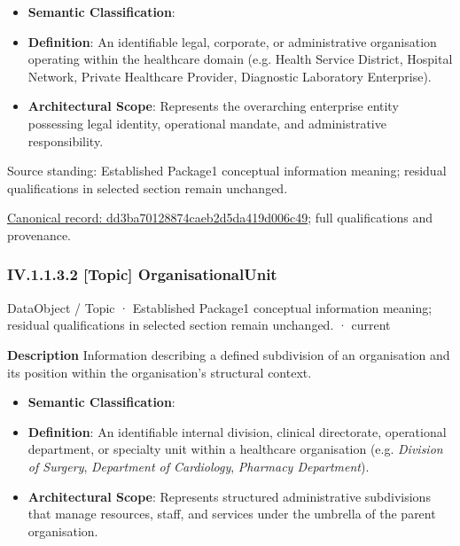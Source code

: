 \begin{itemize}


\item \textbf{Semantic Classification}: \texttt{}

\item \textbf{Definition}: An identifiable legal, corporate, or administrative organisation operating within the healthcare domain (e.g. Health Service District, Hospital Network, Private Healthcare Provider, Diagnostic Laboratory Enterprise).

\item \textbf{Architectural Scope}: Represents the overarching enterprise entity possessing legal identity, operational mandate, and administrative responsibility.

\end{itemize}


Source standing: Established Package1 conceptual information meaning; residual qualifications in selected section remain unchanged.


{\footnotesize \href{../../../../../../../../continuum/application/data-object/topic/dd3ba70128874caeb2d5da419d006c49.md}{Canonical record: dd3ba70128874caeb2d5da419d006c49}; full qualifications and provenance.}\par
\subsubsection*{IV.1.1.3.2 [Topic] OrganisationalUnit}
\label{navigation:IV.1.1.3.2}

\label{element:2c884cdd6a4b41a184818e3a7e540897}
{\small DataObject / Topic · Established Package1 conceptual information meaning; residual qualifications in selected section remain unchanged. · current}\par

\textbf{Description}
Information describing a defined subdivision of an organisation and its position within the organisation's structural context.



\begin{itemize}


\item \textbf{Semantic Classification}: \texttt{}

\item \textbf{Definition}: An identifiable internal division, clinical directorate, operational department, or specialty unit within a healthcare organisation (e.g. \emph{Division of Surgery}, \emph{Department of Cardiology}, \emph{Pharmacy Department}).

\item \textbf{Architectural Scope}: Represents structured administrative subdivisions that manage resources, staff, and services under the umbrella of the parent organisation.

\end{itemize}


